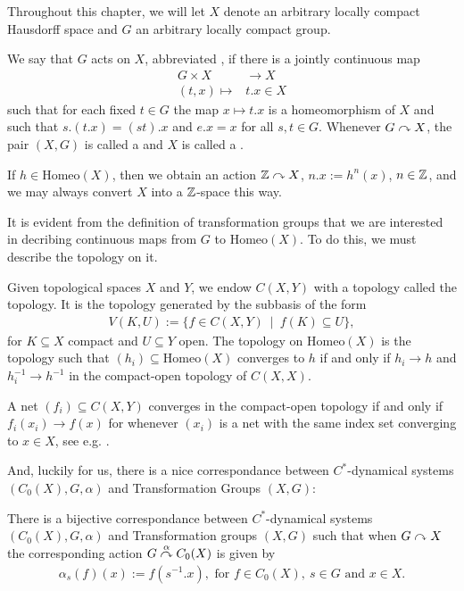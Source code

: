 Throughout this chapter, we will let $X$ denote an arbitrary locally compact Hausdorff space and $G$ an arbitrary locally compact group. 
\begin{definition}
	We say that $G$ acts on $X$, abbreviated , if there is a jointly continuous map
	\begin{align*}
		G \times X &\to X\\
		(t,x) \mapsto &t.x \in X
	\end{align*}
	such that for each fixed $t \in G$ the map $x \mapsto t.x$ is a homeomorphism of $X$ and such that $s.(t.x) = (st).x$ and $e.x = x$ for all $s,t \in G$. Whenever $G \stackrel{}{\curvearrowright} X$, the pair $(X,G)$ is called a  and $X$ is called a .
\end{definition}
\begin{example}
	If $h \in \mathrm{Homeo}(X)$, then we obtain an action $\mathbb{Z}  \stackrel{}{\curvearrowright} X$, $n.x := h^n(x)$, $n \in \mathbb{Z}$, and we may always convert $X$ into a $\mathbb{Z}$-space this way.
\end{example}
It is evident from the definition of transformation groups that we are interested in decribing continuous maps from $G$ to $\mathrm{Homeo}(X)$. To do this, we must describe the topology on it.
\begin{definition}
	Given topological spaces $X$ and $Y$, we endow $C(X,Y)$ with a topology called the  topology. It is the topology generated by the subbasis of the form
	\begin{align*}
		V(K,U) := \{ f \in C(X,Y) \ \mid \ f(K) \subseteq U\},
	\end{align*}
	for $K \subseteq X$ compact and $U \subseteq Y$ open. The topology on $\mathrm{Homeo}(X)$ is the topology such that $(h_i) \subseteq \mathrm{Homeo}(X)$ converges to $h$ if and only if $h_i \to h$ and $h_i^{-1} \to h^{-1}$ in the compact-open topology of $C(X,X)$.
\end{definition}
\begin{remark}
	A net $(f_i) \subseteq C(X,Y)$ converges in the compact-open topology if and only if $f_i(x_i) \to f(x)$ for whenever $(x_i)$ is a net with the same index set converging to $x \in X$, see e.g. \cite[Lemma 1.30]{williamscrossed}.
\end{remark}
And, luckily for us, there is a nice correspondance between $C^*$-dynamical systems $(C_0(X),G,\alpha)$ and Transformation Groups $(X,G)$:
\begin{proposition}
	There is a bijective correspondance between $C^*$-dynamical systems $(C_0(X),G,\alpha)$ and Transformation groups $(X,G)$ such that when $G \stackrel{}{\curvearrowright} X$ the corresponding action $G \stackrel{\alpha}{\curvearrowright} C_0(X)$ is given by
	\begin{align*}
		\alpha_s(f)(x):= f(s^{-1}.x), \text{ for } f \in C_0(X), \ s \in G \text{ and } x \in X.
	\end{align*}
	\label{dynamiccorr}
\end{proposition}
